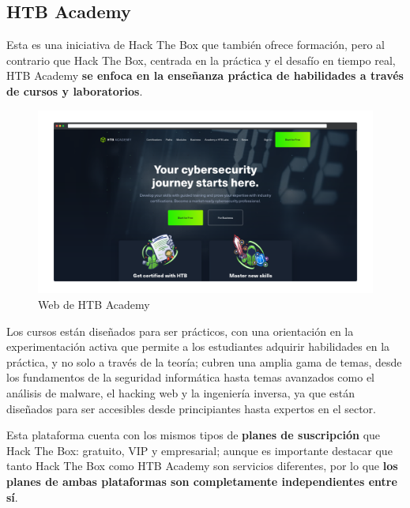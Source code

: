         \newpage

    
    \subsection{HTB Academy}
    
        Esta es una iniciativa de Hack The Box que también ofrece formación, pero al contrario que Hack The Box, centrada en la práctica y el desafío en tiempo real, HTB Academy \textbf{se enfoca en la enseñanza práctica de habilidades a través de cursos y laboratorios}.
        
        \begin{figure}[h]
            \centering
            \includegraphics[width=\textwidth]{images/Capturas/Web de HTB Academy.png}
            \caption{Web de HTB Academy}
            \label{fig:HTB-Academy-web}
        \end{figure}
        
        Los cursos están diseñados para ser prácticos, con una orientación en la experimentación activa que permite a los estudiantes adquirir habilidades en la práctica, y no solo a través de la teoría; cubren una amplia gama de temas, desde los fundamentos de la seguridad informática hasta temas avanzados como el análisis de malware, el hacking web y la ingeniería inversa, ya que están diseñados para ser accesibles desde principiantes hasta expertos en el sector.
        
        Esta plataforma cuenta con los mismos tipos de \textbf{planes de suscripción} que Hack The Box: gratuito, VIP y empresarial; aunque es importante destacar que tanto Hack The Box como HTB Academy son servicios diferentes, por lo que \textbf{los planes de ambas plataformas son completamente independientes entre sí}.
        
        \newpage
    
